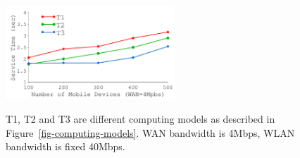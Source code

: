 {
\begin{figure}[th]
\begin{center}
	\centerline{\includegraphics[width=2.5in]{Figures/g_plot_simulation-wan-4Mpbs.pdf}}
	{
		T1, T2 and T3 are different computing models as described in
		Figure~\ref{fig-computing-models}. WAN bandwidth is 4Mbps,
		WLAN bandwidth is fixed 40Mbps.
	}
\end{center}
\end{figure}
}
